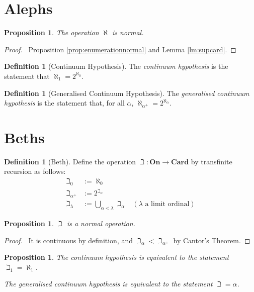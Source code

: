 \documentclass{book}
\let\qed\relax
\newtheorem{prop}[ax]{Proposition}
\theoremstyle{definition}
\newtheorem{df}[ax]{Definition}
\begin{document}
\section{Alephs}

\begin{prop}
The operation $\aleph$ is normal.
\end{prop}

\begin{proof}
\pf\ Proposition \ref{prop:enumerationnormal} and Lemma \ref{lm:supcard}. \qed
\end{proof}

\begin{df}[Continuum Hypothesis]
The \emph{continuum hypothesis} is the statement that $\aleph_1 = 2^{\aleph_0}$.
\end{df}

\begin{df}[Generalised Continuum Hypothesis]
The \emph{generalised continuum hypothesis} is the statement that, for all $\alpha$, $\aleph_{\alpha^+} = 2^{\aleph_\alpha}$.
\end{df}

\section{Beths}

\begin{df}[Beth]
Define the operation $\beth : \mathbf{On} \rightarrow \mathbf{Card}$ by transfinite recursion as follows:
\begin{align*}
\beth_0 & := \aleph_0 \\
\beth_{\alpha^+} & := 2^{\beth_\alpha} \\
\beth_\lambda & := \bigcup_{\alpha < \lambda} \beth_\alpha & (\lambda \text{ a limit ordinal})
\end{align*}
\end{df}

\begin{prop}
$\beth$ is a normal operation.
\end{prop}

\begin{proof}
\pf\ It is continuous by definition, and $\beth_\alpha < \beth_{\alpha^+}$ by Cantor's Theorem. \qed
\end{proof}

\begin{prop}
The continuum hypothesis is equivalent to the statement $\beth_1 = \aleph_1$.

The generalised continuum hypothesis is equivalent to the statement $\beth = \alpha$.
\end{prop}
\end{document}
